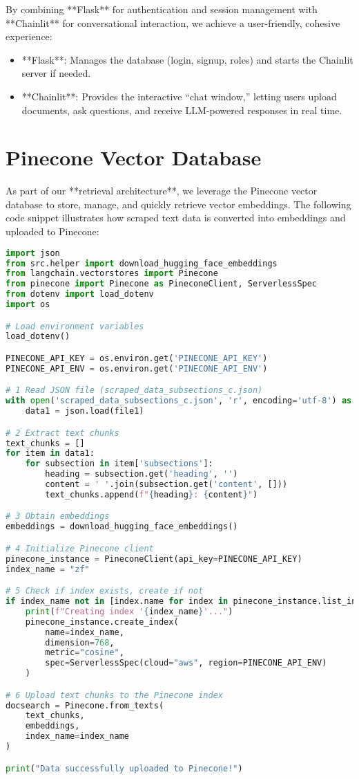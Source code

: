 \noindent
By combining **Flask** for authentication and session management with **Chainlit** for conversational interaction, we achieve a user-friendly, cohesive experience:
\begin{itemize}
    \item **Flask**: Manages the database (login, signup, roles) and starts the Chainlit server if needed.
    \item **Chainlit**: Provides the interactive “chat window,” letting users upload documents, ask questions, and receive LLM-powered responses in real time.
\end{itemize}

\section{Pinecone Vector Database}
\label{sec:pinecone-db}

As part of our **retrieval architecture**, we leverage the Pinecone vector database to store, manage, and quickly
retrieve vector embeddings. The following code snippet illustrates how scraped text data is converted into embeddings and
uploaded to Pinecone:

\begin{lstlisting}[language=Python, caption={Storing Scraped Data in Pinecone}, basicstyle=\small\ttfamily]
import json
from src.helper import download_hugging_face_embeddings
from langchain.vectorstores import Pinecone
from pinecone import Pinecone as PineconeClient, ServerlessSpec
from dotenv import load_dotenv
import os

# Load environment variables
load_dotenv()

PINECONE_API_KEY = os.environ.get('PINECONE_API_KEY')
PINECONE_API_ENV = os.environ.get('PINECONE_API_ENV')

# 1 Read JSON file (scraped_data_subsections_c.json)
with open('scraped_data_subsections_c.json', 'r', encoding='utf-8') as file1:
    data1 = json.load(file1)

# 2 Extract text chunks
text_chunks = []
for item in data1:
    for subsection in item['subsections']:
        heading = subsection.get('heading', '')
        content = ' '.join(subsection.get('content', []))
        text_chunks.append(f"{heading}: {content}")

# 3 Obtain embeddings
embeddings = download_hugging_face_embeddings()

# 4 Initialize Pinecone client
pinecone_instance = PineconeClient(api_key=PINECONE_API_KEY)
index_name = "zf"

# 5 Check if index exists, create if not
if index_name not in [index.name for index in pinecone_instance.list_indexes()]:
    print(f"Creating index '{index_name}'...")
    pinecone_instance.create_index(
        name=index_name,
        dimension=768,
        metric="cosine",
        spec=ServerlessSpec(cloud="aws", region=PINECONE_API_ENV)
    )

# 6 Upload text chunks to the Pinecone index
docsearch = Pinecone.from_texts(
    text_chunks,
    embeddings,
    index_name=index_name
)

print("Data successfully uploaded to Pinecone!")
\end{lstlisting}

